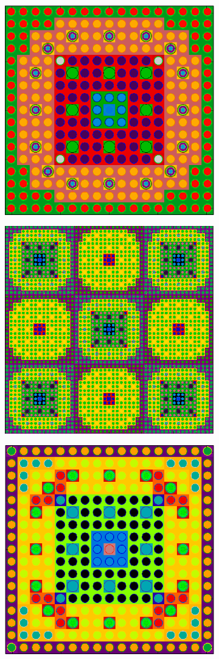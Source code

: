 \begin{figure}
\begin{subfigure}{.5\textwidth}
  \includegraphics[width=.7\linewidth]{figures/workflow/opencg/unique-neighbor-cells-xy-24-16-assm}
  \caption{}
  \label{fig:assm-unique-neighbors}
\end{subfigure}
\begin{subfigure}{.5\textwidth}
  \centering
  \includegraphics[width=.7\linewidth]{figures/workflow/opencg/unique-neighbor-cells-xy-colorset}
  \caption{}
  \label{fig:colorset-unique-neighbors}
\end{subfigure}
\begin{subfigure}{.5\textwidth}
  \centering
  \includegraphics[width=.7\linewidth]{figures/workflow/opencg/neighbor-cells-xy-24-16-assm}

\end{subfigure}
\end{figure}
